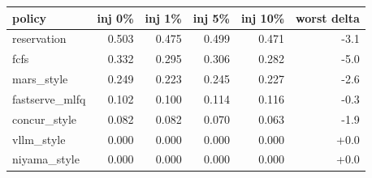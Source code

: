 \begin{tabular}{lrrrrr}
\toprule
policy & inj 0\% & inj 1\% & inj 5\% & inj 10\% & worst delta \\
\midrule
reservation & 0.503 & 0.475 & 0.499 & 0.471 & -3.1 \\
fcfs & 0.332 & 0.295 & 0.306 & 0.282 & -5.0 \\
mars\_style & 0.249 & 0.223 & 0.245 & 0.227 & -2.6 \\
fastserve\_mlfq & 0.102 & 0.100 & 0.114 & 0.116 & -0.3 \\
concur\_style & 0.082 & 0.082 & 0.070 & 0.063 & -1.9 \\
vllm\_style & 0.000 & 0.000 & 0.000 & 0.000 & +0.0 \\
niyama\_style & 0.000 & 0.000 & 0.000 & 0.000 & +0.0 \\
\bottomrule
\end{tabular}
